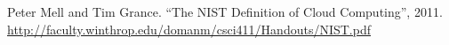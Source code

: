 \documentclass[a4paper,12pt]{article}
\begin{document}

{\footnotesize\begin{thebibliography}{1}
 Peter Mell and Tim Grance.
 ``The NIST Definition of Cloud Computing'',
 2011. \\
 \url{http://faculty.winthrop.edu/domanm/csci411/Handouts/NIST.pdf}















\end{thebibliography}}
\end{document}
